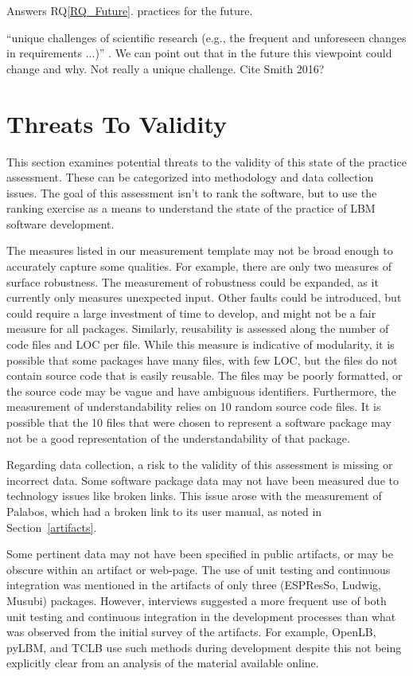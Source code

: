 \documentclass[final, 3p, times, authoryear]{elsarticle}
\newcommand{\rqref}[1]{RQ\ref{#1}}
\begin{document}
Answers \rqref{RQ_Future}.  practices for the future.

``unique challenges of scientific research (e.g., the frequent and unforeseen
changes in requirements ...)'' \citep{PintoEtAl2018}. We can point out that in
the future this viewpoint could change and why.  Not really a unique challenge.
Cite Smith 2016?

\section{Threats To Validity} \label{threats}

This section examines potential threats to the validity of this state of the
practice assessment. These can be categorized into methodology and data
collection issues. The goal of this assessment isn't to rank the software, but
to use the ranking exercise as a means to understand the state of the practice
of LBM software development.

The measures listed in our measurement template may not be broad enough to
accurately capture some qualities. For example, there are only two measures of
surface robustness. The measurement of robustness could be expanded, as it
currently only measures unexpected input. Other faults could be introduced, but
could require a large investment of time to develop, and might not be a fair
measure for all packages. Similarly, reusability is assessed along the number of
code files and LOC per file. While this measure is indicative of modularity, it
is possible that some packages have many files, with few LOC, but the files do
not contain source code that is easily reusable. The files may be poorly
formatted, or the source code may be vague and have ambiguous identifiers.
Furthermore, the measurement of understandability relies on 10 random source
code files. It is possible that the 10 files that were chosen to represent a
software package may not be a good representation of the understandability of
that package.

Regarding data collection, a risk to the validity of this assessment is missing
or incorrect data. Some software package data may not have been measured due to
technology issues like broken links. This issue arose with the measurement of
Palabos, which had a broken link to its user manual, as noted in
Section~\ref{artifacts}. 

Some pertinent data may not have been specified in public artifacts, or may be
obscure within an artifact or web-page. The use of unit testing and continuous
integration was mentioned in the artifacts of only three (ESPResSo, Ludwig,
Musubi) packages. However, interviews suggested a more frequent use of both unit
testing and continuous integration in the development processes than what was
observed from the initial survey of the artifacts. For example, OpenLB, pyLBM,
and TCLB use such methods during development despite this not being explicitly
clear from an analysis of the material available online. 
\end{document}
